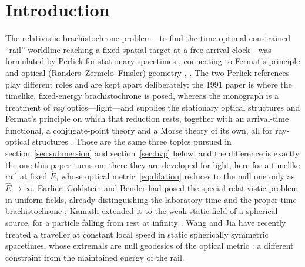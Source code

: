 \documentclass[12pt]{iopart}
\theoremstyle{plain}
\theoremstyle{definition}
\theoremstyle{remark}
\newcommand{\Ehat}{\hat E}
\begin{document}
\section{Introduction}
\label{sec:intro}
The relativistic brachistochrone problem---to find the time-optimal constrained ``rail''
worldline reaching a fixed spatial target at a free arrival clock---was formulated by
Perlick for stationary spacetimes \cite{Perlick1991}, connecting to Fermat's
principle and optical (Randers--Zermelo--Finsler) geometry
\cite[\S\S6.5--6.6,~7.3]{PerlickRayOptics},
\cite{Randers1941,GibbonsWerner2008,GibbonsRanders2009,BaoRoblesShen}. The two
Perlick references play different roles and are kept apart deliberately: the 1991
paper is where the timelike, fixed-energy brachistochrone is posed, whereas the
monograph is a treatment of \emph{ray} optics---light---and supplies the stationary
optical structures and Fermat's principle on which that reduction rests, together
with an arrival-time functional, a conjugate-point theory and a Morse theory of its
own, all for ray-optical structures \cite[\S\S7.3--7.5]{PerlickRayOptics}. Those
are the same three topics pursued in section~\ref{sec:submersion} and
section~\ref{sec:bvp} below, and the difference is exactly the one this paper turns
on: there they are developed for light, here for a timelike rail at fixed
$\Ehat$, whose optical metric~\eqref{eq:dilation} reduces to the null one only as
$\Ehat\to\infty$.
Earlier, Goldstein and Bender had posed the special-relativistic problem in uniform
fields, already distinguishing the laboratory-time and the proper-time brachistochrone
\cite{GoldsteinBender1986}; Kamath extended it to the weak static field of a spherical
source, for a particle falling from rest at infinity \cite{Kamath1988}. Wang and Jia
have recently treated a traveller at constant local speed in static spherically
symmetric spacetimes, whose extremals are null geodesics of the optical metric
\cite{WangJia2026}: a different constraint from the maintained energy of the rail.
\end{document}
